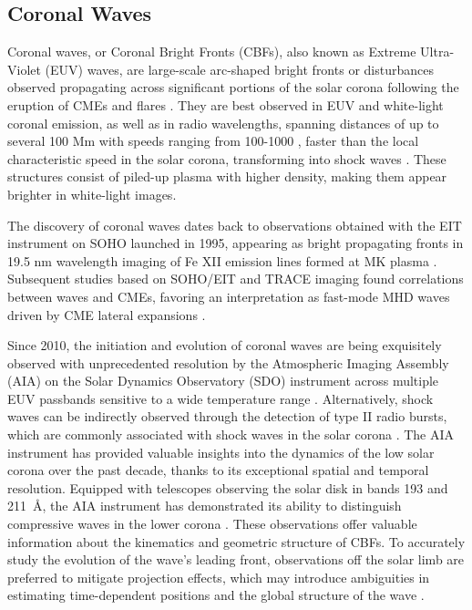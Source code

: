 \subsection{Coronal Waves}
Coronal waves, or Coronal Bright Fronts (CBFs), also known as Extreme Ultra-Violet (EUV) waves, are large-scale arc-shaped bright fronts or disturbances observed propagating across significant portions of the solar corona following the eruption of CMEs and flares \citep{thompson_1998, nindos_2008, vrsnak_2008, magdalenic_2010, veronig_2010, warmuth_2015}. They are best observed in EUV and white-light coronal emission, as well as in radio wavelengths, spanning distances of up to several 100 Mm with speeds ranging from 100-1000 \kms, faster than the local characteristic speed in the solar corona, transforming into shock waves \citep{liu_2014, pick_2006, thompson_2009, nitta_2013}. These structures consist of piled-up plasma with higher density, making them appear brighter in white-light images.

The discovery of coronal waves dates back to observations obtained with the EIT instrument on SOHO launched in 1995, appearing as bright propagating fronts in 19.5 nm wavelength imaging of Fe XII emission lines formed at  MK plasma \citep{thompson_1998}. Subsequent studies based on SOHO/EIT and TRACE imaging found correlations between waves and CMEs, favoring an interpretation as fast-mode MHD waves driven by CME lateral expansions \citep{biesecker_2002}.

Since 2010, the initiation and evolution of coronal waves are being exquisitely observed with unprecedented resolution by the Atmospheric Imaging Assembly (AIA) on the Solar Dynamics Observatory (SDO) instrument \citep{lemen_2012} across multiple EUV passbands sensitive to a wide temperature range \citep{nitta_2013}. Alternatively, shock waves can be indirectly observed through the detection of type II radio bursts, which are commonly associated with shock waves in the solar corona \cite{vrsnak_2008}.
The AIA instrument has provided valuable insights into the dynamics of the low solar corona over the past decade, thanks to its exceptional spatial and temporal resolution. Equipped with telescopes observing the solar disk in bands 193 and 211~\AA, the AIA instrument has demonstrated its ability to distinguish compressive waves in the lower corona \cite{patsourakos_2010, ma_2011, kozarev_2011}. These observations offer valuable information about the kinematics and geometric structure of CBFs. To accurately study the evolution of the wave's leading front, observations off the solar limb are preferred to mitigate projection effects, which may introduce ambiguities in estimating time-dependent positions and the global structure of the wave \cite{kozarev_2015}.

